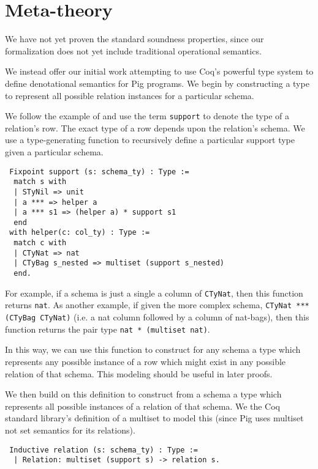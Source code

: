 \section{Meta-theory}
\label{sec:soundness}

We have not yet proven the standard soundness properties, since our formalization does not yet include traditional operational semantics.

We instead offer our initial work attempting to use Coq's powerful type system to define denotational semantics for Pig programs. We begin by constructing a type to represent all possible relation instances for a particular schema.

We follow the example of \cite{malecha2010rdbms} and use the term \texttt{support} to denote the type of a relation's row. The exact type of a row depends upon the relation's schema. We use a type-generating function to recursively define a particular support type given a particular schema.

\begin{lstlisting}
 Fixpoint support (s: schema_ty) : Type :=
  match s with
  | STyNil => unit
  | a *** => helper a
  | a *** s1 => (helper a) * support s1
  end
 with helper(c: col_ty) : Type :=
  match c with
  | CTyNat => nat
  | CTyBag s_nested => multiset (support s_nested)
  end.
\end{lstlisting}

For example, if a schema is just a single a column of \texttt{CTyNat}, then this function returns \texttt{nat}. As another example, if given the more complex schema, \texttt{CTyNat *** (CTyBag CTyNat)} (i.e. a nat column followed by a column of nat-bags), then this function returns the pair type \texttt{nat * (multiset nat)}.

In this way, we can use this function to construct for any schema a type which represents any possible instance of a row which might exist in any possible relation of that schema. This modeling should be useful in later proofs.

We then build on this definition to construct from a schema a type which represents all possible instances of a relation of that schema. We the Coq standard library's definition of a multiset to model this (since Pig uses multiset not set semantics for its relations).

\begin{lstlisting}
 Inductive relation (s: schema_ty) : Type :=
  | Relation: multiset (support s) -> relation s.
\end{lstlisting}

